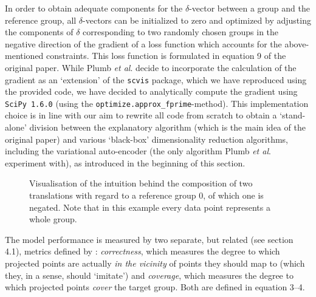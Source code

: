 In order to obtain adequate components for the $\delta$-vector between a group and the reference group, all $\delta$-vectors can be initialized to zero and optimized by adjusting the components of $\delta$ corresponding to two randomly chosen groups in the negative direction of the gradient of a loss function which accounts for the above-mentioned constraints. This loss function is formulated in equation 9 of the original paper. While Plumb \textit{et al}. decide to incorporate the calculation of the gradient as an `extension' of the \texttt{scvis} package, which we have reproduced using the provided code, we have decided to analytically compute the gradient using \texttt{SciPy 1.6.0} (using the \texttt{optimize.approx\_fprime}-method). This implementation choice is in line with our aim to rewrite all code from scratch to obtain a `stand-alone' division between the explanatory algorithm (which is the main idea of the original paper) and various `black-box' dimensionality reduction algorithms, including the variational auto-encoder (the only algorithm Plumb \textit{et al}. experiment with), as introduced in the beginning of this section.\\

\begin{figure}
  \centering
  
  \caption{Visualisation of the intuition behind the composition of two translations with regard to a reference group $0$, of which one is negated. Note that in this example every data point represents a whole group.}
\end{figure}

The model performance is measured by two separate, but related (see section 4.1), metrics defined by \cite[p.~3]{plumb2020explaining}: \textit{correctness}, which measures the degree to which projected points are actually \textit{in the vicinity} of points they should map to (which they, in a sense, should `imitate') and \textit{coverage}, which measures the degree to which projected points \textit{cover} the target group. Both are defined in equation 3--4.

